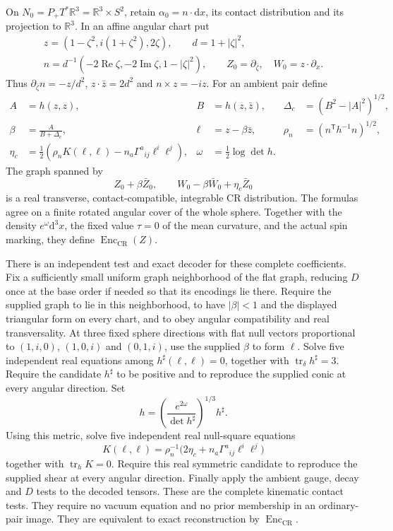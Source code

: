 \documentclass[
  english,
  11pt,
  reqno]{amsart}
\begin{document}
On \(N_0=P_+T^*\mathbb R^3=\mathbb R^3\times S^2\), retain
\(\alpha_0=n\cdot\mathrm dx\), its contact distribution and its
projection to \(\mathbb R^3\). In an affine angular chart put \[
\begin{gathered}
z=(1-\zeta^2,i(1+\zeta^2),2\zeta),\qquad
d=1+|\zeta|^2,\\
n=d^{-1}(-2\operatorname{Re}\zeta,-2\operatorname{Im}\zeta,1-|\zeta|^2),
\qquad Z_0=\partial_{\bar\zeta},\quad W_0=z\cdot\partial_x.
\end{gathered}
\] Thus \(\partial_{\bar\zeta}n=-z/d^2\), \(z\cdot\bar z=2d^2\) and
\(n\times z=-iz\). For an ambient pair define%
 \[
\begin{aligned}
A&=h(z,z),& B&=h(z,\bar z),&
\Delta_c&=(B^2-|A|^2)^{1/2},\\
\beta&=\frac{A}{B+\Delta_c},&
\ell&=z-\beta\bar z,&
\rho_n&=(n^{\mathsf T}h^{-1}n)^{1/2},\\
\eta_c&=\frac12\left(\rho_nK(\ell,\ell)
-n_a\Gamma^a{}_{ij}\ell^i\ell^j\right),
&\omega&=\frac12\log\det h.
\end{aligned}
\] The graph spanned by%
 \[
Z_0+\beta\bar Z_0,\qquad
W_0-\beta\bar W_0+\eta_c\bar Z_0
\] is a real transverse, contact-compatible, integrable CR distribution.
The formulas agree on a finite rotated angular cover of the whole
sphere. Together with the density \(e^\omega\mathrm d^3x\), the fixed
value \(\tau=0\) of the mean curvature, and the actual spin marking,
they define \(\operatorname{Enc}_{\mathrm{CR}}(Z)\).

There is an independent test and exact decoder for these complete
coefficients. Fix a sufficiently small uniform graph neighborhood of the
flat graph, reducing \(D\) once at the base order if needed so that its
encodings lie there. Require the supplied graph to lie in this
neighborhood, to have \(|\beta|<1\) and the displayed triangular form on
every chart, and to obey angular compatibility and real transversality.
At three fixed sphere directions with flat null vectors proportional to
\((1,i,0)\), \((1,0,i)\) and \((0,1,i)\), use the supplied \(\beta\) to
form \(\ell\). Solve five independent real equations among
\(h^\sharp(\ell,\ell)=0\), together with
\(\operatorname{tr}_\delta h^\sharp=3\). Require the candidate
\(h^\sharp\) to be positive and to reproduce the supplied conic at every
angular direction. Set%
 \[
h=\left(\frac{e^{2\omega}}{\det h^\sharp}\right)^{1/3}h^\sharp.
\] Using this metric, solve five independent real null-square equations%
 \[
K(\ell,\ell)
=\rho_n^{-1}\bigl(2\eta_c+n_a\Gamma^a{}_{ij}\ell^i\ell^j\bigr)
\] together with \(\operatorname{tr}_hK=0\). Require this real symmetric
candidate to reproduce the supplied shear at every angular direction.
Finally apply the ambient gauge, decay and \(D\) tests to the decoded
tensors. These are the complete kinematic contact tests. They require no
vacuum equation and no prior membership in an ordinary-pair image. They
are equivalent to exact reconstruction by
\(\operatorname{Enc}_{\mathrm{CR}}\).
\end{document}
